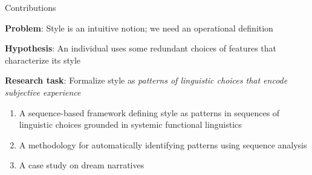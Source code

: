 \documentclass[handout,10pt]{beamer}
\begin{document}
\begin{frame}{Contributions}

\textbf{Problem}: Style is an intuitive notion; we need an operational definition

\vspace{0.25cm}
\pause

\textbf{Hypothesis}: An individual uses some redundant choices of features that characterize its style

\vspace{0.25cm}
\pause

\textbf{Research task}: Formalize style as \textit{patterns of linguistic choices that encode subjective experience}

\vspace{0.5cm}
\pause

\begin{enumerate}[<+->]
    \item A sequence-based framework defining style as patterns in sequences of linguistic choices grounded in systemic functional linguistics
    \item A methodology for automatically identifying patterns using sequence analysis
    \item A case study on dream narratives %
\end{enumerate}
    
\end{frame}
\end{document}

